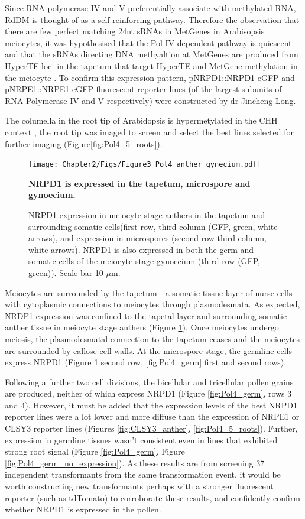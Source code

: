 Since RNA polymerase IV and V preferentially associate with methylated RNA, RdDM is thought of as a self-reinforcing pathway. Therefore the observation that there are few perfect matching 24nt sRNAs in MetGenes in Arabisopsis meiocytes, it was hypothesised that the Pol IV dependent pathway is quiescent and that the sRNAs directing DNA methyaltion at MetGenes are produced from HyperTE loci in the tapetum that target HyperTE and MetGene methylation in the meiocyte \citep{RN199,RN187}. To confirm this expression pattern, pNRPD1::NRPD1-eGFP and pNRPE1::NRPE1-eGFP fluorescent reporter lines (of the largest subunits of RNA Polymerase IV and V respectively\citep{RN33}) were constructed by dr Jincheng Long.

The columella in the root tip of Arabidopsis is hypermetylated in the CHH context \citep{RN261}, the root tip was imaged to screen and select the best lines selected for further imaging (Figure\ref{fig:Pol4_5_roots}).

\begin{figure}[htbp!] 
\centering    
    \texttt{[image: Chapter2/Figs/Figure3\_Pol4\_anther\_gynecium.pdf]}
\caption{\textbf{NRPD1 is expressed in the tapetum, microspore and gynoecium.}}
\label{fig:Pol4_anther}
\captionsetup{font=small}
    \caption*{NRPD1 expression in meiocyte stage anthers in the tapetum and surrounding somatic cells(first row, third column (GFP, green, white arrows), and expression in microspores (second row third column, white arrows). NRPD1 is also expressed in both the germ and somatic cells of the meiocyte stage gynoecium (third row (GFP, green)). Scale bar 10 $\mu$m.}
\end{figure}

Meiocytes are surrounded by the tapetum - a somatic tissue layer of nurse cells with cytoplasmic connections to meiocytes through plasmodesmata. As expected, NRDP1 expression was confined to the tapetal layer and surrounding somatic anther tissue in meiocyte stage anthers (Figure \ref{fig:Pol4_anther}). Once meiocytes undergo meiosis, the plasmodesmatal connection to the tapetum ceases and the meiocytes are surrounded by callose cell walls. At the microspore stage, the germline cells express NRPD1 (Figure \ref{fig:Pol4_anther} second row, \ref{fig:Pol4_germ} first and second rows). 

Following a further two cell divisions, the bicellular and tricellular pollen grains are produced, neither of which express NRPD1 (Figure \ref{fig:Pol4_germ}, rows 3 and 4). However, it must be added that the expression levels of the best NRPD1 reporter lines were a lot lower and more diffuse than the expression of NRPE1 or CLSY3 reporter lines (Figures \ref{fig:CLSY3_anther}, \ref{fig:Pol4_5_roots}). Further, expression in germline tissues wasn't consistent even in lines that exhibited strong root signal (Figure \ref{fig:Pol4_germ}, Figure \ref{fig:Pol4_germ_no_expression}). As these results are from screening 37 independent transformants from the same transformation event, it would be worth constructing new transformants perhaps with a stronger fluorescent reporter (such as tdTomato) to corroborate these results, and confidently confirm whether NRPD1 is expressed in the pollen. 

